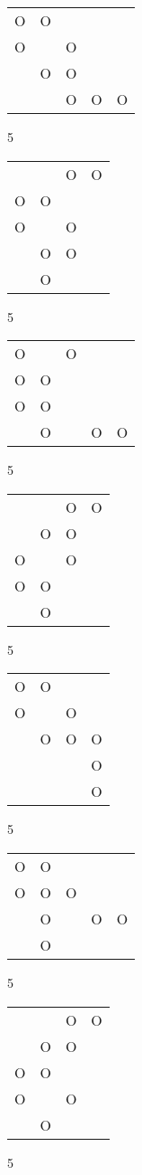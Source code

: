 \begin{tabular}{|m{0.2cm}m{0.2cm}m{0.2cm}m{0.2cm}m{0.2cm}|}\hline
O&O& & & \\
O& &O& & \\
 &O&O& & \\
 & &O&O&O\\
\hline\end{tabular}5
\begin{tabular}{|m{0.2cm}m{0.2cm}m{0.2cm}m{0.2cm}|}\hline
 & &O&O\\
O&O& & \\
O& &O& \\
 &O&O& \\
 &O& & \\
\hline\end{tabular}5
\begin{tabular}{|m{0.2cm}m{0.2cm}m{0.2cm}m{0.2cm}m{0.2cm}|}\hline
O& &O& & \\
O&O& & & \\
O&O& & & \\
 &O& &O&O\\
\hline\end{tabular}5
\begin{tabular}{|m{0.2cm}m{0.2cm}m{0.2cm}m{0.2cm}|}\hline
 & &O&O\\
 &O&O& \\
O& &O& \\
O&O& & \\
 &O& & \\
\hline\end{tabular}5
\begin{tabular}{|m{0.2cm}m{0.2cm}m{0.2cm}m{0.2cm}|}\hline
O&O& & \\
O& &O& \\
 &O&O&O\\
 & & &O\\
 & & &O\\
\hline\end{tabular}5
\begin{tabular}{|m{0.2cm}m{0.2cm}m{0.2cm}m{0.2cm}m{0.2cm}|}\hline
O&O& & & \\
O&O&O& & \\
 &O& &O&O\\
 &O& & & \\
\hline\end{tabular}5
\begin{tabular}{|m{0.2cm}m{0.2cm}m{0.2cm}m{0.2cm}|}\hline
 & &O&O\\
 &O&O& \\
O&O& & \\
O& &O& \\
 &O& & \\
\hline\end{tabular}5
